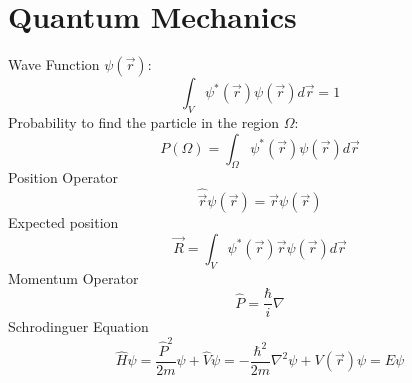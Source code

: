 \documentclass{article}
\begin{document}
\section{Quantum Mechanics}
Wave Function $\psi(\vec{r})$:
\begin{equation}
  \int_V \psi^*(\vec{r}) \psi(\vec{r})d\vec{r} = 1
\end{equation}
Probability to find the particle in the region $\Omega$:
\begin{equation}
  P(\Omega) = \int_\Omega \psi^*(\vec{r}) \psi(\vec{r}) d\vec{r}
\end{equation}
Position Operator
\begin{equation}
  \widehat{\vec{r}}\psi(\vec{r}) = \vec{r}\psi(\vec{r})
\end{equation}
Expected position
\begin{equation}
  \vec{R} = \int_V \psi^*(\vec{r}) \vec{r}\psi(\vec{r}) d\vec{r}
\end{equation}
Momentum Operator
\begin{equation}
  \widehat{P} = \frac{\hbar}{i}\nabla
\end{equation}
Schrodinguer Equation
\begin{equation}
  \widehat{H}\psi = \frac{\widehat{P}^2}{2m}\psi + \widehat{V}\psi = -\frac{\hbar^2}{2m}\nabla^2 \psi + V(\vec{r})\psi =  E\psi
\end{equation}
\end{document}
